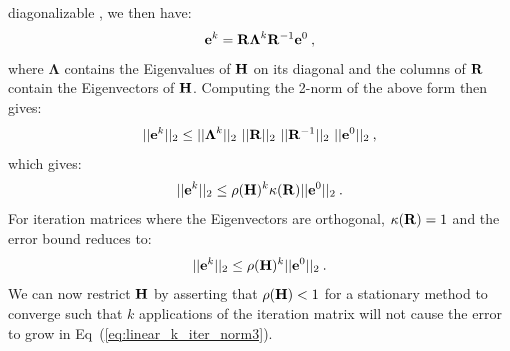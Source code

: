 \documentclass[letterpaper,12pt]{article}
\begin{document}
diagonalizable \cite{saad_iterative_2003}, we then have:
\begin{equation}
  \mathbf{e}^{k} =
  \mathbf{R}\boldsymbol{\Lambda}^k\mathbf{R}^{-1}\mathbf{e}^0\:,
  \label{eq:linear_k_iter_error_diag}
\end{equation}
where $\boldsymbol{\Lambda}$ contains the Eigenvalues of $\mathbf{H}$ on
its diagonal and the columns of $\mathbf{R}$ contain the Eigenvectors of
$\mathbf{H}$. Computing the 2-norm of the above form then gives:
\begin{equation}
  ||\ve{e}^{k}||_2 \leq ||\boldsymbol{\Lambda}^k||_2\ 
  ||\ve{R}||_2\ ||\ve{R}^{-1}||_2\ ||\ve{e}^0||_2\:,
  \label{eq:linear_k_iter_norm1}
\end{equation}
which gives:
\begin{equation}
  ||\mathbf{e}^{k}||_2 \leq \rho(\mathbf{H})^k \kappa(\mathbf{R})
  ||\mathbf{e}^0||_2\:.
  \label{eq:linear_k_iter_norm2}
\end{equation}
For iteration matrices where the Eigenvectors are orthogonal,
$\kappa(\mathbf{R})=1$ and the error bound reduces to:
\begin{equation}
  ||\mathbf{e}^{k}||_2 \leq \rho(\mathbf{H})^k ||\mathbf{e}^0||_2\:.
  \label{eq:linear_k_iter_norm3}
\end{equation}
We can now restrict $\mathbf{H}$ by asserting that $\rho(\mathbf{H}) < 1$
for a stationary method to converge such that $k$ applications of the
iteration matrix will not cause the error to grow in
Eq~(\ref{eq:linear_k_iter_norm3}). 
\end{document}
